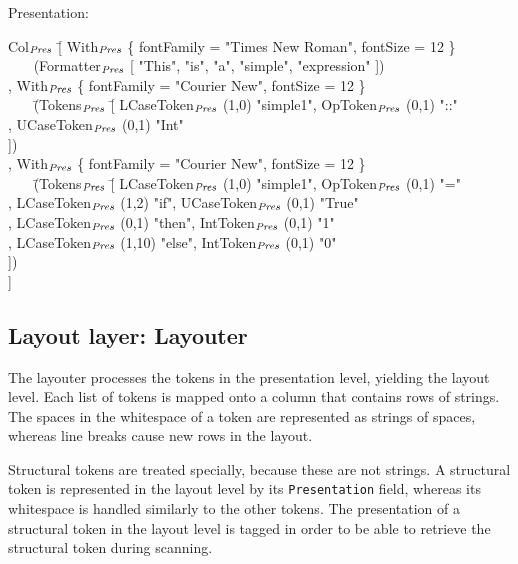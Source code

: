 \documentclass{speauth}
\begin{document}
Presentation:
\small \ttfamily
\begin{tabbing}
Col$_{\mathit{Pres}}$ \= [ With$_{\mathit{Pres}}$ \{ fontFamily = "Times New Roman", fontSize = 12 \}\\
       \>  ~~~ (Formatter$_{\mathit{Pres}}$ [ "This", "is", "a", "simple", "expression" ])\\
       \>, With$_{\mathit{Pres}}$ \{ fontFamily = "Courier New", fontSize = 12 \}\\
       \>  ~~~ \= (Tokens$_{\mathit{Pres}}$ \= [ LCaseToken$_{\mathit{Pres}}$ (1,0) "simple1",  OpToken$_{\mathit{Pres}}$ (0,1) "::"\\  
       \>          \>              \> , UCaseToken$_{\mathit{Pres}}$ (0,1) "Int"\\
       \>          \>              \> ])\\
       \>, With$_{\mathit{Pres}}$ \{ fontFamily = "Courier New",  fontSize = 12 \}\\
       \>  ~~~ \= (Tokens$_{\mathit{Pres}}$ \= [ LCaseToken$_{\mathit{Pres}}$ (1,0) "simple1", OpToken$_{\mathit{Pres}}$ (0,1) "="\\
       \>          \>              \> , LCaseToken$_{\mathit{Pres}}$ (1,2) "if", UCaseToken$_{\mathit{Pres}}$ (0,1) "True"\\
       \>          \>              \> , LCaseToken$_{\mathit{Pres}}$ (0,1) "then", IntToken$_{\mathit{Pres}}$ (0,1) "1"\\
       \>          \>              \> , LCaseToken$_{\mathit{Pres}}$ (1,10) "else", IntToken$_{\mathit{Pres}}$ (0,1) "0"\\
       \>          \>              \> ])\\
             \> ]
\end{tabbing}
\rmfamily \normalsize


%																
\subsection{Layout layer: Layouter} \label{sect:layouter}

The layouter processes the tokens in the presentation level, yielding the layout level. Each list of tokens is mapped onto a column that contains rows of strings. The spaces in the whitespace of a token are represented as strings of spaces, whereas line breaks cause new rows in the layout. 

Structural tokens are treated specially, because these are not strings. A structural token is represented in the layout level by its {\tt Presentation} field, whereas its whitespace is handled similarly to the other tokens. The presentation of a structural token in the layout level is tagged in order to be able to retrieve the structural token during scanning.
\end{document}
